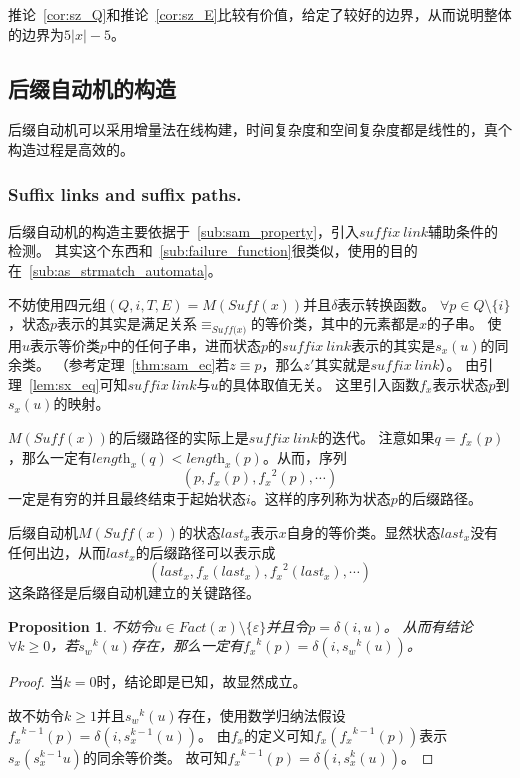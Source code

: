 \documentclass[UTF8]{ctexart}
\newtheorem{prop}[thm]{Proposition}
\theoremstyle{definition}
\theoremstyle{remark}
\numberwithin{equation}{subsection}
\newcommand{\equsuf}[1][x]{\equiv_{\textit{Suff(#1)}}}
\newcommand{\Suff}{\textit{Suff}}
\newcommand{\len}[1][x]{\textit{length}_{#1}}
\begin{document}
	推论~\ref{cor:sz_Q}和推论~\ref{cor:sz_E}比较有价值，给定了较好的边界，从而说明整体的边界为$5|x|-5$。
	
\subsection{后缀自动机的构造}	
	
	后缀自动机可以采用增量法在线构建，时间复杂度和空间复杂度都是线性的，真个构造过程是高效的。
	
\subsubsection{Suffix links and suffix paths.}
	
	后缀自动机的构造主要依据于~\ref{sub:sam_property}，引入$suffix\ link$辅助条件的检测。
	其实这个东西和~\ref{sub:failure_function}很类似，使用的目的在~\ref{sub:as_strmatch_automata}。
	
	不妨使用四元组$(Q, i, T, E) = M(\Suff(x))$并且$\delta$表示转换函数。
	$\forall p \in Q \setminus \{i\}$，状态$p$表示的其实是满足关系$\equsuf[x]$的等价类，其中的元素都是$x$的子串。
	使用$u$表示等价类$p$中的任何子串，进而状态$p$的$suffix\ link$表示的其实是$s_x(u)$的同余类。
	（参考定理~\ref{thm:sam_ec}若$z \equiv p$，那么$z'$其实就是$suffix\ link$）。
	由引理~\ref{lem:sx_eq}可知$suffix\ link$与$u$的具体取值无关。
	这里引入函数$f_x$表示状态$p$到$s_x(u)$的映射。
	
	$M(\Suff(x))$的后缀路径的实际上是$suffix\ link$的迭代。
	注意如果$q = f_x(p)$，那么一定有$\len[x](q) < \len[x](p)$。从而，序列
	\[
		(p, f_x(p), {f_x}^2(p), \cdots)
	\]
	一定是有穷的并且最终结束于起始状态$i$。这样的序列称为状态$p$的后缀路径。
	
	后缀自动机$M(\Suff(x))$的状态$last_x$表示$x$自身的等价类。显然状态$last_x$没有任何出边，从而$last_x$的后缀路径可以表示成
	\[
		(last_x, f_x(last_x), {f_x}^2(last_x), \cdots)
	\]
	这条路径是后缀自动机建立的关键路径。
	
	\begin{prop}
	\label{prop:sx_fx}
		不妨令$u \in Fact(x) \setminus \{ \varepsilon \}$并且令$p = \delta(i, u)$。
		从而有结论$\forall k \ge 0$，若${s_w}^k(u)$存在，那么一定有${f_x}^k(p) = \delta(i, {s_w}^k(u))$。
	\end{prop}
	\begin{proof}
		当$k = 0$时，结论即是已知，故显然成立。
		
		故不妨令$k \ge 1$并且${s_w}^k(u)$存在，使用数学归纳法假设${f_x}^{k-1}(p) = \delta(i, s_x^{k-1}(u))$。
		由$f_x$的定义可知$f_x({f_x}^{k-1}(p))$表示$s_x(s_x^{k-1}u)$的同余等价类。
		故可知${f_x}^{k-1}(p) = \delta(i, s_x^{k}(u))$。
	\end{proof}
	
\end{document}

